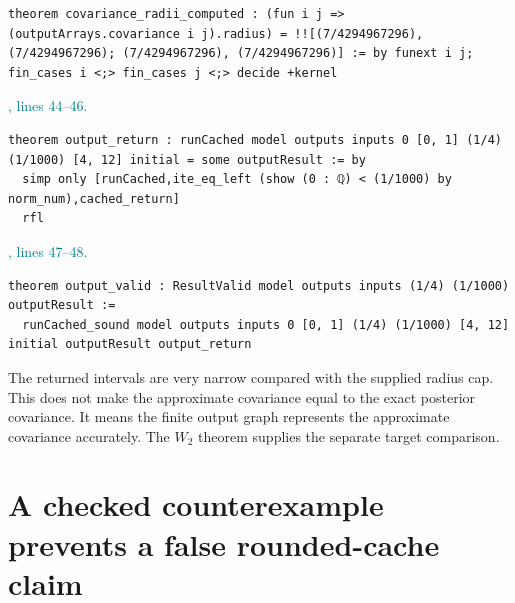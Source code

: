 \documentclass[11pt]{article}\usepackage{needspace}\renewcommand{\paperkind}{Lean companion}\setlength{\parskip}{0.35em}
\begin{document}
\begin{lstlisting}[style=BayesSource]
theorem covariance_radii_computed : (fun i j => (outputArrays.covariance i j).radius) = !![(7/4294967296), (7/4294967296); (7/4294967296), (7/4294967296)] := by funext i j; fin_cases i <;> fin_cases j <;> decide +kernel
\end{lstlisting}



{\small\textcolor{teal}{, lines 44--46.}\par}

\begin{lstlisting}[style=BayesSource]
theorem output_return : runCached model outputs inputs 0 [0, 1] (1/4) (1/1000) [4, 12] initial = some outputResult := by
  simp only [runCached,ite_eq_left (show (0 : ℚ) < (1/1000) by norm_num),cached_return]
  rfl
\end{lstlisting}



{\small\textcolor{teal}{, lines 47--48.}\par}

\begin{lstlisting}[style=BayesSource]
theorem output_valid : ResultValid model outputs inputs (1/4) (1/1000) outputResult :=
  runCached_sound model outputs inputs 0 [0, 1] (1/4) (1/1000) [4, 12] initial outputResult output_return
\end{lstlisting}

The returned intervals are very narrow compared with the supplied radius cap. This does not make the approximate covariance equal to the exact posterior covariance. It means the finite output graph represents the approximate covariance accurately. The $W_2$ theorem supplies the separate target comparison.

\section{A checked counterexample prevents a false rounded-cache claim}
\end{document}

